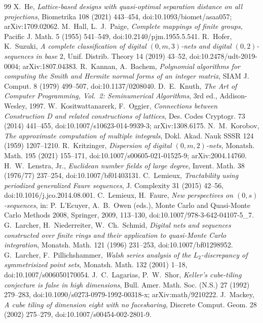 \documentclass[11pt]{amsart}
\theoremstyle{definition}
\theoremstyle{plain}
\begin{document}
\begin{thebibliography}{99}
 X.~He, \emph{Lattice-based designs with quasi-optimal separation distance on all projections}, Biometrika 108 (2021) 443--454, doi:10.1093/biomet/asaa057; arXiv:1709.02062.
 M.~Hall, L.~J.~Paige, \emph{Complete mappings of finite groups}, Pacific J. Math. 5 (1955) 541--549, doi:10.2140/pjm.1955.5.541.
 R.~Hofer, K.~Suzuki, \emph{A complete classification of digital $(0,m,3)$-nets and digital $(0,2)$-sequences in base $2$}, Unif. Distrib. Theory 14 (2019) 43--52, doi:10.2478/udt-2019-0004; arXiv:1807.04383.
 R.~Kannan, A.~Bachem, \emph{Polynomial algorithms for computing the Smith and Hermite normal forms of an integer matrix}, SIAM J. Comput. 8 (1979) 499--507, doi:10.1137/0208040.
 D.~E.~Knuth, \emph{The Art of Computer Programming, Vol.~2: Seminumerical Algorithms}, 3rd ed., Addison-Wesley, 1997.
 W.~Kositwattanarerk, F.~Oggier, \emph{Connections between Construction D and related constructions of lattices}, Des. Codes Cryptogr. 73 (2014) 441--455, doi:10.1007/s10623-014-9939-3; arXiv:1308.6175.
 N.~M.~Korobov, \emph{The approximate computation of multiple integrals}, Dokl. Akad. Nauk SSSR 124 (1959) 1207--1210.
 R.~Kritzinger, \emph{Dispersion of digital $(0,m,2)$-nets}, Monatsh. Math. 195 (2021) 155--171, doi:10.1007/s00605-021-01525-9; arXiv:2004.14760.
 H.~W.~Lenstra, Jr., \emph{Euclidean number fields of large degree}, Invent. Math. 38 (1976/77) 237--254, doi:10.1007/bf01403131.
 C.~Lemieux, \emph{Tractability using periodized generalized Faure sequences}, J. Complexity 31 (2015) 42--56, doi:10.1016/j.jco.2014.08.001.
 C.~Lemieux, H.~Faure, \emph{New perspectives on $(0,s)$-sequences}, in: P.~L'Ecuyer, A.~B.~Owen (eds.), Monte Carlo and Quasi-Monte Carlo Methods 2008, Springer, 2009, 113--130, doi:10.1007/978-3-642-04107-5\_7.
 G.~Larcher, H.~Niederreiter, W.~Ch.~Schmid, \emph{Digital nets and sequences constructed over finite rings and their application to quasi-Monte Carlo integration}, Monatsh. Math. 121 (1996) 231--253, doi:10.1007/bf01298952.
 G.~Larcher, F.~Pillichshammer, \emph{Walsh series analysis of the $L_2$-discrepancy of symmetrisized point sets}, Monatsh. Math. 132 (2001) 1--18, doi:10.1007/s006050170054.
 J.~C.~Lagarias, P.~W.~Shor, \emph{Keller's cube-tiling conjecture is false in high dimensions}, Bull. Amer. Math. Soc. (N.S.) 27 (1992) 279--283, doi:10.1090/s0273-0979-1992-00318-x; arXiv:math/9210222.
 J.~Mackey, \emph{A cube tiling of dimension eight with no facesharing}, Discrete Comput. Geom. 28 (2002) 275--279, doi:10.1007/s00454-002-2801-9.

\end{thebibliography}
\end{document}
